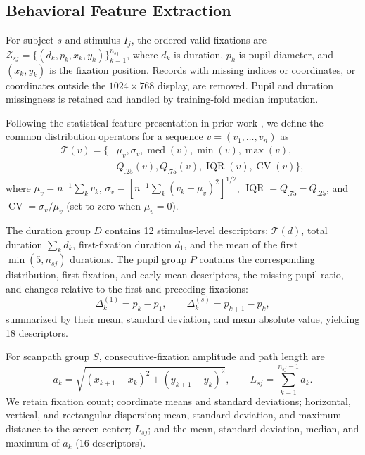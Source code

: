 \documentclass[conference,a4paper]{IEEEtran}
\begin{document}
\subsection{Behavioral Feature Extraction}
For subject $s$ and stimulus $I_j$, the ordered valid fixations are
$\mathcal{Z}_{sj}=\{(d_k,p_k,x_k,y_k)\}_{k=1}^{n_{sj}}$, where $d_k$ is duration, $p_k$ is pupil diameter, and $(x_k,y_k)$ is the fixation position. Records with missing indices or coordinates, or coordinates outside the $1024\times768$ display, are removed. Pupil and duration missingness is retained and handled by training-fold median imputation.

Following the statistical-feature presentation in prior work \cite{vu2026comparative}, we define the common distribution operators for a sequence $v=(v_1,\ldots,v_n)$ as
\begin{equation}
\begin{aligned}
\mathcal{T}(v)=\{&\mu_v,\sigma_v,\operatorname{med}(v),\min(v),\max(v),\\
&Q_{.25}(v),Q_{.75}(v),\operatorname{IQR}(v),\operatorname{CV}(v)\},
\end{aligned}
\label{eq:distribution_features}
\end{equation}
where $\mu_v=n^{-1}\sum_k v_k$, $\sigma_v=[n^{-1}\sum_k(v_k-\mu_v)^2]^{1/2}$, $\operatorname{IQR}=Q_{.75}-Q_{.25}$, and $\operatorname{CV}=\sigma_v/\mu_v$ (set to zero when $\mu_v=0$).

The duration group $D$ contains 12 stimulus-level descriptors: $\mathcal{T}(d)$, total duration $\sum_k d_k$, first-fixation duration $d_1$, and the mean of the first $\min(5,n_{sj})$ durations. The pupil group $P$ contains the corresponding distribution, first-fixation, and early-mean descriptors, the missing-pupil ratio, and changes relative to the first and preceding fixations:
\begin{equation}
\Delta_k^{(1)}=p_k-p_1,\qquad \Delta_k^{(s)}=p_{k+1}-p_k,
\label{eq:pupil_changes}
\end{equation}
summarized by their mean, standard deviation, and mean absolute value, yielding 18 descriptors.

For scanpath group $S$, consecutive-fixation amplitude and path length are
\begin{equation}
a_k=\sqrt{(x_{k+1}-x_k)^2+(y_{k+1}-y_k)^2},\qquad L_{sj}=\sum_{k=1}^{n_{sj}-1}a_k.
\label{eq:scanpath}
\end{equation}
We retain fixation count; coordinate means and standard deviations; horizontal, vertical, and rectangular dispersion; mean, standard deviation, and maximum distance to the screen center; $L_{sj}$; and the mean, standard deviation, median, and maximum of $a_k$ (16 descriptors).
\end{document}
